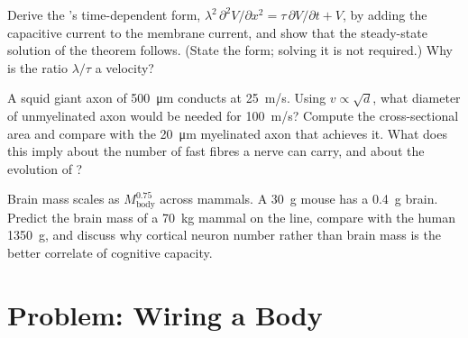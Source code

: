 \begin{exercise}[$\star\star\star$]\label{exo:b3:nervous-systems:10}
Derive the 's time-dependent form, $\lambda^{2}\,\partial^{2}
V/\partial x^{2} = \tau\,\partial V/\partial t + V$, by adding the
capacitive current to the membrane current, and show that the
steady-state solution of the theorem follows. (State the form; solving
it is not required.) Why is the ratio $\lambda/\tau$ a velocity?
\end{exercise}

\begin{exercise}[$\star\star\star$]\label{exo:b3:nervous-systems:11}
A squid giant axon of \qty{500}{\micro m} conducts at \qty{25}{m/s}.
Using $v \propto \sqrt{d}$, what diameter of unmyelinated axon would be
needed for \qty{100}{m/s}? Compute the cross-sectional area and compare
with the \qty{20}{\micro m} myelinated axon that achieves it. What does
this imply about the number of fast fibres a nerve can carry, and about
the evolution of ?
\end{exercise}

\begin{exercise}[$\star\star\star$]\label{exo:b3:nervous-systems:12}
Brain mass scales as $M_{\text{body}}^{0.75}$ across mammals. A
\qty{30}{g} mouse has a \qty{0.4}{g} brain. Predict the brain mass of a
\qty{70}{kg} mammal on the line, compare with the human \qty{1350}{g},
and discuss why cortical neuron number rather than brain mass is the
better correlate of cognitive capacity.
\end{exercise}

\section{Problem: Wiring a Body}

